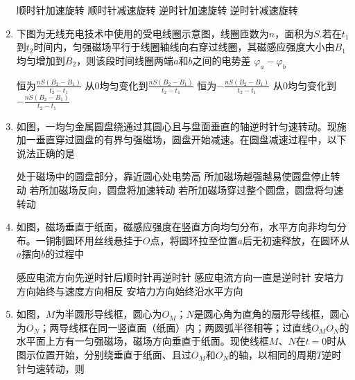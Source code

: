 \begin{enumerate}
\fourchoices
{顺时针加速旋转}
{顺时针减速旋转}
{逆时针加速旋转}
{逆时针减速旋转}

\item 
{}
下图为无线充电技术中使用的受电线圈示意图，线圈匝数为$ n $，面积为$ S $.若在$ t_{1} $到$ t_{2} $时间内，匀强磁场平行于线圈轴线向右穿过线圈，其磁感应强度大小由$ B_{1} $均匀增加到$ B_{2} $，则该段时间线圈两端$ a $和$ b $之间的电势差 $\varphi _ { a } - \varphi _ { b }$  
\begin{figure}[h!]
\centering

\end{figure}


\fourchoices
{恒为$\frac { n S \left( B _ { 2 } - B _ { 1 } \right) } { t _ { 2 } - t _ { 1 } }$}
{从$ 0 $均匀变化到$\frac { n S \left( B _ { 2 } - B _ { 1 } \right) } { t _ { 2 } - t _ { 1 } }$}
{恒为$-\frac { n S \left( B _ { 2 } - B _ { 1 } \right) } { t _ { 2 } - t _ { 1 } }$}
{从$ 0 $均匀变化到$-\frac { n S \left( B _ { 2 } - B _ { 1 } \right) } { t _ { 2 } - t _ { 1 } }$}

\item 
{}
如图，一均匀金属圆盘绕通过其圆心且与盘面垂直的轴逆时针匀速转动。现施加一垂直穿过圆盘的有界匀强磁场，圆盘开始减速。在圆盘减速过程中，以下说法正确的是  
\begin{figure}[h!]
\centering

\end{figure}

\fourchoices
{处于磁场中的圆盘部分，靠近圆心处电势高}
{所加磁场越强越易使圆盘停止转动}
{若所加磁场反向，圆盘将加速转动}
{若所加磁场穿过整个圆盘，圆盘将匀速转动}

\item 
{}
如图，磁场垂直于纸面，磁感应强度在竖直方向均匀分布，水平方向非均匀分布。一铜制圆环用丝线悬挂于$ O $点，将圆环拉至位置$ a $后无初速释放，在圆环从$ a $摆向$ b $的过程中  
\begin{figure}[h!]
\centering

\end{figure}


\fourchoices
{感应电流方向先逆时针后顺时针再逆时针}
{感应电流方向一直是逆时针}
{安培力方向始终与速度方向相反}
{安培力方向始终沿水平方向}


\item 
{}
如图，$ M $为半圆形导线框，圆心为$ O_M $；$ N $是圆心角为直角的扇形导线框，圆心为$ O_N $；两导线框在同一竖直面（纸面）内；两圆弧半径相等；过直线$ O_MO_N $的水平面上方有一匀强磁场，磁场方向垂直于纸面。现使线框$ M $、$ N $在$ t=0 $时从图示位置开始，分别绕垂直于纸面、且过$ O_M $和$ O_N $的轴，以相同的周期$ T $逆时针匀速转动，则  
\begin{figure}[h!]
\centering

\end{figure}



\end{enumerate}
